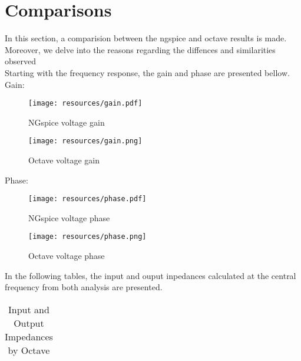 \section{Comparisons}
\label{sec:comparsisons}

In this section, a comparision between the ngspice and octave results is made. Moreover, we delve into the reasons regarding the diffences and similarities observed\\
Starting with the frequency response, the gain and phase are presented bellow.
Gain:


\begin{figure} [!htb] 
  \texttt{[image: resources/gain.pdf]}
  \caption{NGspice voltage gain}
  \label{fig:theoplots}
  \endminipage\hfill
\end{figure}



\begin{figure} [!htb] 
  \texttt{[image: resources/gain.png]}
  \caption{Octave voltage gain}
  \label{fig:theoplots}
  \endminipage\hfill
\end{figure}
\FloatBarrier

Phase:


\begin{figure} [!htb] 
  \texttt{[image: resources/phase.pdf]}
  \caption{NGspice voltage phase}
  \label{fig:theoplots}
  \endminipage\hfill
\end{figure}



\begin{figure} [!htb] 
  \texttt{[image: resources/phase.png]}
  \caption{Octave voltage phase}
  \label{fig:theoplots}
  \endminipage\hfill
\end{figure}
\FloatBarrier

In the following tables, the input and ouput inpedances  calculated at the central frequency from both analysis are presented.

%    

\FloatBarrier
\begin{table}[h]
  \centering
  \begin{tabular}{|c|c|c|}
    \hline    
    
    \hline
  \end{tabular}
  \caption{Input and Output Impedances by Octave}
  \label{tab:Spice1}
\end{table}
\FloatBarrier   



